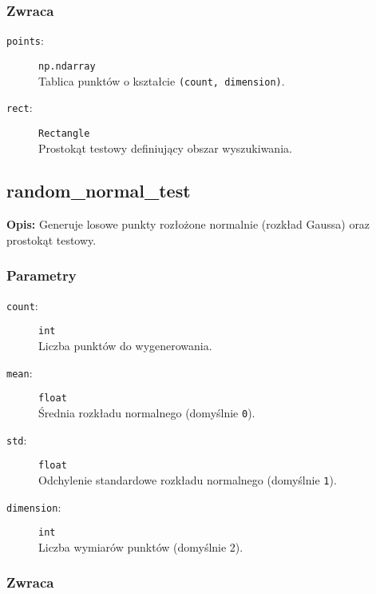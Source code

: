 \documentclass[12pt]{article}
\begin{document}
\subsubsection{Zwraca}

\begin{description}
    \item[\texttt{points}:] \texttt{np.ndarray} \\
    Tablica punktów o kształcie \texttt{(count, dimension)}.
    
    \item[\texttt{rect}:] \texttt{Rectangle} \\
    Prostokąt testowy definiujący obszar wyszukiwania.
\end{description}

\subsection{random\_normal\_test}

\textbf{Opis:} Generuje losowe punkty rozłożone normalnie (rozkład Gaussa) oraz prostokąt testowy.

\subsubsection{Parametry}

\begin{description}
    \item[\texttt{count}:] \texttt{int} \\
    Liczba punktów do wygenerowania.
    
    \item[\texttt{mean}:] \texttt{float} \\
    Średnia rozkładu normalnego (domyślnie \texttt{0}).
    
    \item[\texttt{std}:] \texttt{float} \\
    Odchylenie standardowe rozkładu normalnego (domyślnie \texttt{1}).
    
    \item[\texttt{dimension}:] \texttt{int} \\
    Liczba wymiarów punktów (domyślnie 2).
\end{description}

\subsubsection{Zwraca}
\end{document}
